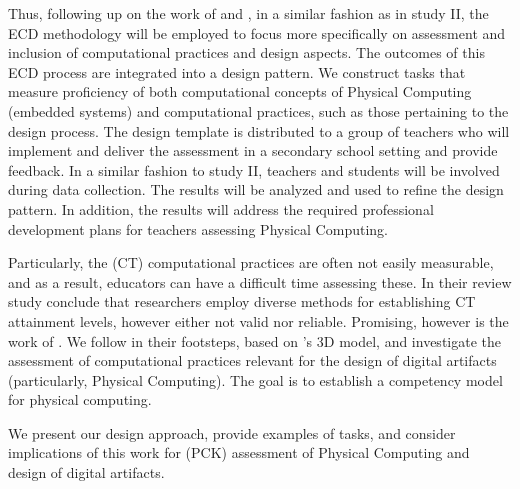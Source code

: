 Thus, following up on the work of \citeauthor{mareen2018PhysComp} and \citeauthor{atmatzidou2012evaluating}, in a similar fashion as in study II, the ECD methodology will be employed to focus more specifically on assessment and inclusion of computational practices and design aspects. The outcomes of this ECD process are integrated into a design pattern. We construct tasks that measure proficiency of both computational concepts of Physical Computing (embedded systems) and computational practices, such as those pertaining to the design process. The design template is distributed to a group of teachers who will implement and deliver the assessment in a secondary school setting and provide feedback. In a similar fashion to study II, teachers and students will be involved during data collection. The results will be analyzed and used to refine the design pattern. In addition, the results will address the required professional development plans for teachers assessing Physical Computing.



Particularly, the (CT) computational practices are often not easily measurable, and as a result, educators can have a difficult time assessing these. In their review study  conclude that researchers employ diverse methods for establishing CT attainment levels, however either not valid nor reliable. Promising, however is the work of . We follow in their footsteps, based on \citeauthor{BrennanResnick2012}'s 3D model, and investigate the assessment of computational practices relevant for the design of digital artifacts (particularly, Physical Computing).
The goal is to establish a competency model for physical computing.
%


We present our design approach, provide examples of tasks, and consider implications of this work for (PCK) assessment of Physical Computing and design of digital artifacts.




